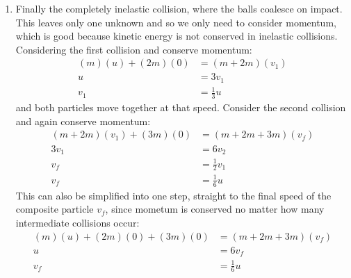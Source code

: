 \begin{problem}[A1969AMIIQ8l]
{\begin{enumerate}
As before, repeating the process for the second collision gives two equations:
\begin{align*} 
2v_{2} &= 2w_{2} + 3w_{3} \\
 2v_{2}^{2} &= 2w_{2}^{2} + 3w_{3}^{2} 
 \end{align*}
with solution for after the collision of $w_{2} = - \frac{1}{5} v_{2} = - \frac{2}{15} u$ and $w_{3} = \frac{4}{5} v_{2} = \frac{8}{15} u$. Thus the final speeds after the second collision are:
\begin{align*} 
v_{1} = - \frac{1}{3}u && w_{2} = - \frac{2}{15}u && w_{3} = \frac{8}{15}u 
\end{align*}
	\item Finally the completely inelastic collision, where the balls coalesce on impact. This leaves only one unknown and so we only need to consider momentum, which is good because kinetic energy is not conserved in inelastic collisions.
Considering the first collision and conserve momentum:
\begin{align*} 
(m)(u) + (2m)(0) &= (m + 2m)(v_{1}) \\
 u &= 3v_{1} \\ 
 v_{1} &= \frac{1}{3}u 
 \end{align*} 
 and both particles move together at that speed.
Consider the second collision and again conserve momentum:
\begin{align*} 
(m + 2m)(v_{1}) + (3m)(0) &= (m + 2m + 3m)(v_{f}) \\ 
3v_{1} &= 6v_{2} \\ 
v_{f} &= \frac{1}{2} v_{1} \\ 
v_{f} &= \frac{1}{6} u 
\end{align*}
This can also be simplified into one step, straight to the final speed of the composite particle $v_{f}$, since mometum is conserved no matter how many intermediate collisions occur:
\begin{align*} 
(m)(u) + (2m)(0) + (3m)(0) &= (m + 2m + 3m)(v_{f}) \\ 
u &= 6 v_{f} \\ 
v_{f} &= \frac{1}{6} u 
\end{align*}
\end{enumerate}

}
\end{problem}